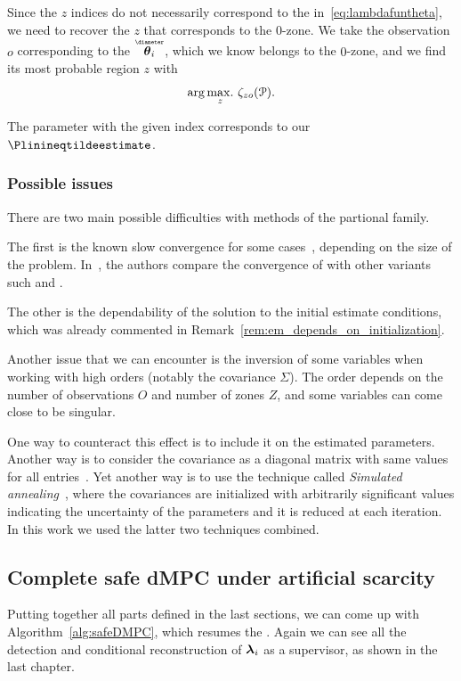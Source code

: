 \documentclass[../main.tex]{subfiles}
\begin{document}
Since the $z$ indices do not necessarily correspond to the in~\eqref{eq:lambdafuntheta}, we need to recover the $z$ that corresponds to the $0$-zone.
We take the observation $o$ corresponding to the $\thetairestricted$, which we know belongs to the $0$-zone, and we find its most probable region $z$ with
\begin{equation*}\label{eq:argmaxz}
  \arg\underset{z}{\max\!.}\ {\zeta_{zo}(\mathcal{P})}.
\end{equation*}

The parameter with the given index corresponds to our $\Plinineqtildeestimate$.

\subsubsection{Possible issues}

There are two main possible difficulties with methods of the partional family.

The first is the known slow convergence for some cases~\cite{CeleuxGovaert1992,Bishop2006,BaudryCeleux2015}, depending on the size of the problem. In~\cite{FariaSoromenho2010}, the authors compare the convergence of \EM{} with other variants such \sEM{} and \CEM{}.

The other is the dependability of the solution to the initial estimate conditions, which was already commented in Remark~\ref{rem:em_depends_on_initialization}.

Another issue that we can encounter is the inversion of some variables when working with high orders (notably the covariance $\Sigma$).
The order depends on the number of observations $O$ and number of zones $Z$, and some variables can come close to be singular.

One way to counteract this effect is to include it on the estimated parameters.
Another way is to consider the covariance as a diagonal matrix with same values for all entries~\cite{KarlisXekalaki2003}.
Yet another way is to use the technique called \emph{Simulated annealing}~\cite{CeleuxGovaert1992,OzerovFevotte2010}, where the covariances are initialized with arbitrarily significant values indicating the uncertainty of the parameters and it is reduced at each iteration.
In this work we used the latter two techniques combined.

\subsection{Complete safe dMPC under artificial scarcity}\label{sec:complete-safe-dmpc-ineq}
Putting together all parts defined in the last sections, we can come up with Algorithm~\ref{alg:safeDMPC}, which resumes the \rpdmpcas{}.
Again we can see all the detection and conditional reconstruction of $\boldsymbol{\lambda}_{i}$ as a supervisor, as shown in the last chapter.
\end{document}
